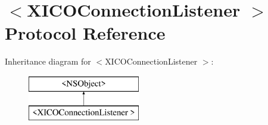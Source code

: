 \hypertarget{protocol_x_i_c_o_connection_listener_01-p}{}\section{$<$X\+I\+C\+O\+Connection\+Listener $>$ Protocol Reference}
\label{protocol_x_i_c_o_connection_listener_01-p}
Inheritance diagram for $<$X\+I\+C\+O\+Connection\+Listener $>$\+:\begin{figure}[H]
\begin{center}
\leavevmode
\includegraphics[height=2.000000cm]{protocol_x_i_c_o_connection_listener_01-p}
\end{center}
\end{figure}
